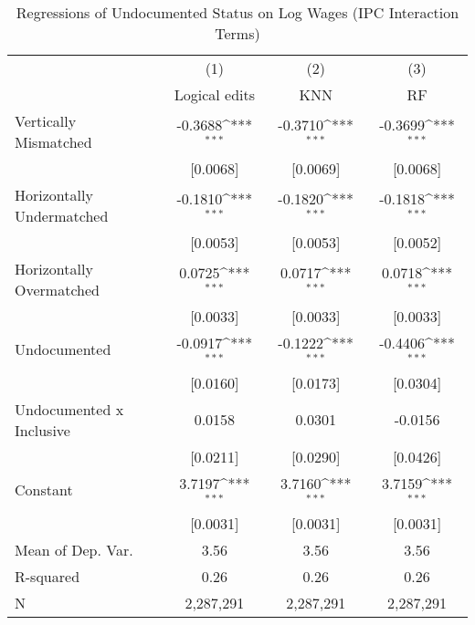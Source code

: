 \begin{table}[htbp]\centering
\def\sym#1{\ifmmode^{#1}\else\(^{#1}\)\fi}
\caption{Regressions of Undocumented Status on Log Wages (IPC Interaction Terms)}
\begin{tabular}{l*{3}{c}}
\toprule
                    &\multicolumn{1}{c}{(1)}         &\multicolumn{1}{c}{(2)}         &\multicolumn{1}{c}{(3)}         \\
                    &Logical edits         &         KNN         &          RF         \\
\midrule
Vertically Mismatched&     -0.3688\sym{***}&     -0.3710\sym{***}&     -0.3699\sym{***}\\
                    &    [0.0068]         &    [0.0069]         &    [0.0068]         \\
\addlinespace
Horizontally Undermatched&     -0.1810\sym{***}&     -0.1820\sym{***}&     -0.1818\sym{***}\\
                    &    [0.0053]         &    [0.0053]         &    [0.0052]         \\
\addlinespace
Horizontally Overmatched&      0.0725\sym{***}&      0.0717\sym{***}&      0.0718\sym{***}\\
                    &    [0.0033]         &    [0.0033]         &    [0.0033]         \\
\addlinespace
Undocumented        &     -0.0917\sym{***}&     -0.1222\sym{***}&     -0.4406\sym{***}\\
                    &    [0.0160]         &    [0.0173]         &    [0.0304]         \\
\addlinespace
Undocumented x Inclusive&      0.0158         &      0.0301         &     -0.0156         \\
                    &    [0.0211]         &    [0.0290]         &    [0.0426]         \\
\addlinespace
Constant            &      3.7197\sym{***}&      3.7160\sym{***}&      3.7159\sym{***}\\
                    &    [0.0031]         &    [0.0031]         &    [0.0031]         \\
\midrule
Mean of Dep. Var.   &        3.56         &        3.56         &        3.56         \\
R-squared           &        0.26         &        0.26         &        0.26         \\
N                   &   2,287,291         &   2,287,291         &   2,287,291         \\
\bottomrule

\end{tabular}
\end{table}
